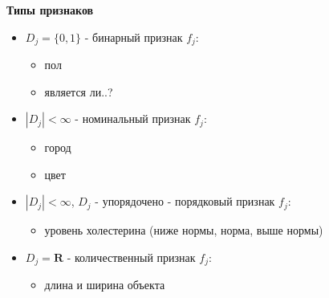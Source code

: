 \documentclass[aps,%
12pt,%
final,%
oneside,
onecolumn,%
musixtex, %
superscriptaddress,%
centertags]{article} %
\theoremstyle{plain}
\theoremstyle{definition}
\theoremstyle{remark}
\begin{document}
\textbf{Типы признаков}

\begin{itemize}
	\item $D_j = \{0,1\}$ - бинарный признак $f_j$:
	\begin{itemize}
		\item пол
		\item является ли..?
	\end{itemize}
	\item $|D_j| < \infty$ - номинальный признак $f_j$:
	\begin{itemize}
		\item город
		\item цвет
	\end{itemize}
	\item $|D_j| < \infty$, $D_j$ - упорядочено - порядковый признак $f_j$:
	\begin{itemize}
		\item уровень холестерина (ниже нормы, норма, выше нормы)
	\end{itemize}
	\item $D_j = \textbf{R}$ - количественный признак $f_j$:
	\begin{itemize}
		\item длина и ширина объекта
	\end{itemize}
\end{itemize}
\end{document}
